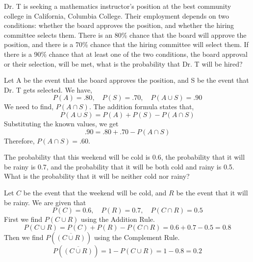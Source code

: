 \begin{example}
    Dr. T is seeking a mathematics instructor's position at the best community college in California, Columbia College. Their employment depends on two conditions: whether the board approves the position, and whether the hiring committee selects them. There is an 80\% chance that the board will approve the position, and there is a 70\% chance that the hiring committee will select them. If there is a 90\% chance that at least one of the two conditions, the board approval or their selection, will be met, what is the probability that Dr. T will be hired?
\end{example}
\begin{solution}
    Let A be the event that the board approves the position, and S be the event that Dr. T gets selected. We have,
    \[
        P(A) = .80, \quad P(S) = .70, \quad P(A \cup S) = .90
    \]
    We need to find, \( P(A \cap S) \).
    The addition formula states that,
    \[
        P(A \cup S) = P(A) + P(S) - P(A \cap S)
    \]
    Substituting the known values, we get
    \[
        .90 = .80 + .70 - P(A \cap S)
    \]
    Therefore, \( P(A \cap S) = .60 \).
\end{solution}

\begin{example}
    The probability that this weekend will be cold is 0.6, the probability that it will be rainy is 0.7, and the probability that it will be both cold and rainy is 0.5. What is the probability that it will be neither cold nor rainy?
\end{example}
\begin{solution}
    Let \( C \) be the event that the weekend will be cold, and \( R \) be the event that it will be rainy. We are given that
    \[
        P(C) = 0.6, \quad P(R) = 0.7, \quad P(C \cap R) = 0.5
    \]
    First we find \( P(C \cup R) \) using the Addition Rule.
    \[
        P(C \cup R) = P(C) + P(R) - P(C \cap R) = 0.6 + 0.7 - 0.5 = 0.8
    \]
    Then we find \( P(\overline{(C \cup R)}) \) using the Complement Rule.
    \[
        P(\overline{(C \cup R)}) = 1 - P(C \cup R) = 1 - 0.8 = 0.2
    \]
\end{solution}
